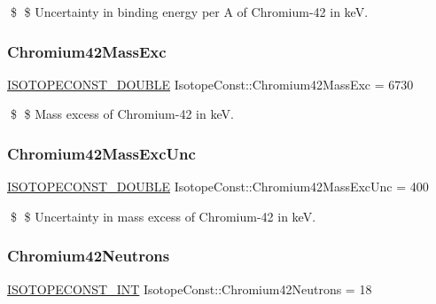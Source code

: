 \$ \$ Uncertainty in binding energy per A of Chromium-\/42 in keV. \mbox{\label{group___isotope_const-_chromium-_cr42_ga31a4fb904f664f6158d8cbad8ef40a10}} 
\subsubsection{\texorpdfstring{Chromium42\+Mass\+Exc}{Chromium42MassExc}}
{\footnotesize\ttfamily \mbox{\hyperlink{group___isotope_const-_macros_ga8f45a7272ce02c0b4c65c44636ed719a}{I\+S\+O\+T\+O\+P\+E\+C\+O\+N\+S\+T\+\_\+\+D\+O\+U\+B\+LE}} Isotope\+Const\+::\+Chromium42\+Mass\+Exc = 6730}

\$ \$ Mass excess of Chromium-\/42 in keV. \mbox{\label{group___isotope_const-_chromium-_cr42_ga2e5cb82ee8fd78919aaa82c14b336420}} 
\subsubsection{\texorpdfstring{Chromium42\+Mass\+Exc\+Unc}{Chromium42MassExcUnc}}
{\footnotesize\ttfamily \mbox{\hyperlink{group___isotope_const-_macros_ga8f45a7272ce02c0b4c65c44636ed719a}{I\+S\+O\+T\+O\+P\+E\+C\+O\+N\+S\+T\+\_\+\+D\+O\+U\+B\+LE}} Isotope\+Const\+::\+Chromium42\+Mass\+Exc\+Unc = 400}

\$ \$ Uncertainty in mass excess of Chromium-\/42 in keV. \mbox{\label{group___isotope_const-_chromium-_cr42_ga1035075391543b2d9794a826f3ac4b6e}} 
\subsubsection{\texorpdfstring{Chromium42\+Neutrons}{Chromium42Neutrons}}
{\footnotesize\ttfamily \mbox{\hyperlink{group___isotope_const-_macros_ga5f18360b3e99483a35c32d789e62621c}{I\+S\+O\+T\+O\+P\+E\+C\+O\+N\+S\+T\+\_\+\+I\+NT}} Isotope\+Const\+::\+Chromium42\+Neutrons = 18}

